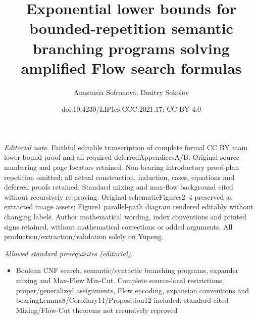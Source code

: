 \documentclass[10pt,a4paper]{article}
\title{Exponential lower bounds for bounded-repetition semantic branching programs solving amplified Flow search formulas}
\author{Anastasia Sofronova, Dmitry Sokolov}
\date{doi:10.4230/LIPIcs.CCC.2021.17; CC BY 4.0}
\begin{document}
\maketitle
\noindent\textit{Editorial note.} Faithful editable transcription of complete formal CC BY main lower-bound proof and all required deferredAppendicesA/B. Original source numbering and page locators retained. Non-bearing introductory proof-plan repetition omitted; all actual construction, induction, cases, equations and deferred proofs retained. Standard mixing and max-flow background cited without recursively re-proving. Original schematicFigures2–4 preserved as extracted image assets; Figure1 parallel-path diagram rendered editably without changing labels. Author mathematical wording, index conventions and printed signs retained, without mathematical corrections or added arguments. All production/extraction/validation solely on Yupeng.\par\medskip
\noindent\textit{Allowed standard prerequisites (editorial).}\begin{itemize}
\item Boolean CNF search, semantic/syntactic branching programs, expander mixing and Max-Flow Min-Cut. Complete source-local restrictions, proper/generalized assignments, Flow encoding, expansion conventions and bearingLemma8/Corollary11/Proposition12 included; standard cited Mixing/Flow-Cut theorems not recursively reproved
\end{itemize}\medskip
\end{document}

